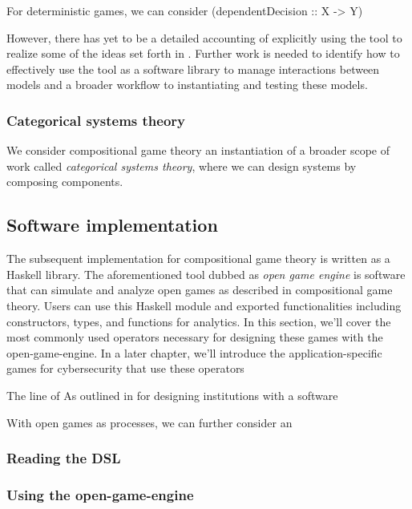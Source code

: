 For deterministic games, we can consider \inlinehs (dependentDecision :: X -> Y)

However, there has yet to be a detailed accounting of explicitly using the tool to realize some of the ideas set forth in \cite{20squares, tan2022a}. Further work is needed to identify how to effectively use the tool as a software library to manage interactions between models and a broader workflow to instantiating and testing these models. 




\subsubsection{Categorical systems theory}
We consider compositional game theory an instantiation of a broader scope of work called \textit{categorical systems theory}, where we can design systems by composing components. 

\subsection{Software implementation}
The subsequent implementation for compositional game theory is written as a Haskell library. 
The aforementioned tool dubbed as \textit{open game engine} is software that can simulate and analyze open games as described in compositional game theory. Users can use this Haskell module and exported functionalities including constructors, types, and functions for analytics. In this section, we'll cover the most commonly used operators necessary for designing these games with the open-game-engine. In a later chapter, we'll introduce the application-specific games for cybersecurity that use these operators

The line of 
As outlined in \cite{tan2022a} for designing institutions with a software 

With open games as processes, we can further consider an 
\subsubsection{Reading the DSL}
\subsubsection{Using the open-game-engine}
\subsubsection{}

